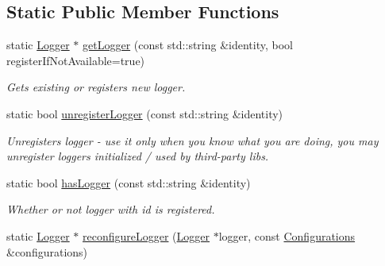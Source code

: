 \subsection*{Static Public Member Functions}
\begin{DoxyCompactItemize}
\item 
\hypertarget{classel_1_1Loggers_aaebf868c558e3ba1d2e4f073a00f1d4a}{static \hyperlink{classel_1_1Logger}{Logger} $\ast$ \hyperlink{classel_1_1Loggers_aaebf868c558e3ba1d2e4f073a00f1d4a}{get\-Logger} (const std\-::string \&identity, bool register\-If\-Not\-Available=true)}\label{classel_1_1Loggers_aaebf868c558e3ba1d2e4f073a00f1d4a}

\begin{DoxyCompactList}\small\item\em Gets existing or registers new logger. \end{DoxyCompactList}\item 
\hypertarget{classel_1_1Loggers_a201d261ea57c070f07f0bf2006158587}{static bool \hyperlink{classel_1_1Loggers_a201d261ea57c070f07f0bf2006158587}{unregister\-Logger} (const std\-::string \&identity)}\label{classel_1_1Loggers_a201d261ea57c070f07f0bf2006158587}

\begin{DoxyCompactList}\small\item\em Unregisters logger -\/ use it only when you know what you are doing, you may unregister loggers initialized / used by third-\/party libs. \end{DoxyCompactList}\item 
\hypertarget{classel_1_1Loggers_a2d7a056cb7d9da3d96c709a2fac5c2bb}{static bool \hyperlink{classel_1_1Loggers_a2d7a056cb7d9da3d96c709a2fac5c2bb}{has\-Logger} (const std\-::string \&identity)}\label{classel_1_1Loggers_a2d7a056cb7d9da3d96c709a2fac5c2bb}

\begin{DoxyCompactList}\small\item\em Whether or not logger with id is registered. \end{DoxyCompactList}\item 
\hypertarget{classel_1_1Loggers_a888aca5bdccccc322da2eed430909d04}{static \hyperlink{classel_1_1Logger}{Logger} $\ast$ \hyperlink{classel_1_1Loggers_a888aca5bdccccc322da2eed430909d04}{reconfigure\-Logger} (\hyperlink{classel_1_1Logger}{Logger} $\ast$logger, const \hyperlink{classel_1_1Configurations}{Configurations} \&configurations)}\label{classel_1_1Loggers_a888aca5bdccccc322da2eed430909d04}


\end{DoxyCompactItemize}
